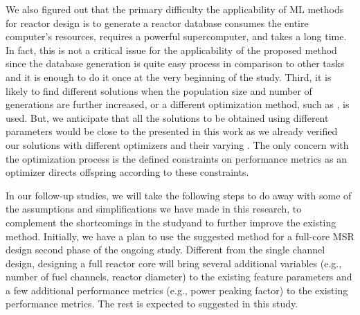     We also figured out \DIFdelbegin {}\DIFdelend that the primary difficulty \DIFdelbegin {}\DIFdelend \DIFaddbegin {}\DIFaddend the applicability of \gls{ML} methods for reactor design is to generate a reactor database \DIFdelbegin {}\DIFdelend \DIFaddbegin {}\DIFaddend consumes the entire computer's resources, requires a powerful supercomputer, and takes a long time. In fact, this is not a critical issue for the applicability of the proposed method since the database generation is \DIFaddbegin {}\DIFaddend quite easy process in comparison to other tasks and it is enough to do it once at the very beginning of the study. Third, it is likely to find different solutions when the population size and \DIFaddbegin {}\DIFaddend number of generations are further increased, or a different optimization method, such as \DIFdelbegin {}\DIFdelend \DIFaddbegin {}\DIFaddend , is used. But, we anticipate that all the solutions to be obtained using different parameters would be close to the \DIFdelbegin {}\DIFdelend \DIFaddbegin {}\DIFaddend presented in this work as we already verified our solutions with different optimizers and their varying \DIFdelbegin {}\DIFdelend \DIFaddbegin {}\DIFaddend . The only concern with the optimization process is the defined constraints on performance metrics as an optimizer directs offspring according to these constraints.

    In our follow-up studies, we will take the following steps to do away with some of the assumptions and simplifications we have made in this research, to complement the shortcomings in the study\DIFaddbegin \DIFadd{, }\DIFaddend and to further improve the existing method. Initially, we have a plan to use the suggested method for a full-core \DIFdelbegin {}\DIFdelend \gls{MSR} design \DIFdelbegin {}\DIFdelend \DIFaddbegin {}\DIFaddend second phase of the ongoing study. Different from the single channel design, designing a full reactor core will bring several additional variables (e.g., \DIFaddbegin {}\DIFaddend number of fuel channels, reactor diameter) to the existing feature parameters and a few additional performance metrics (e.g., power peaking factor) to the existing performance metrics. The rest is expected to \DIFdelbegin {}\DIFdelend \DIFaddbegin {}\DIFaddend suggested in this study.
\DIFaddbegin 

